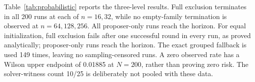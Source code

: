 Table~\ref{tab:probabilistic} reports the three-level results. Full exclusion terminates in all 200 runs at each of $n=16,32$, while no empty-family termination is observed at $n=64,128,256$. All proposer-only runs reach the horizon. For equal initialization, full exclusion fails after one successful round in every run, as proved analytically; proposer-only runs reach the horizon. The exact grouped fallback is used 149 times, leaving no sampling-censored runs. A zero observed rate has a Wilson upper endpoint of 0.01885 at $N=200$, rather than proving zero risk. The solver-witness count 10/25 is deliberately not pooled with these data.
